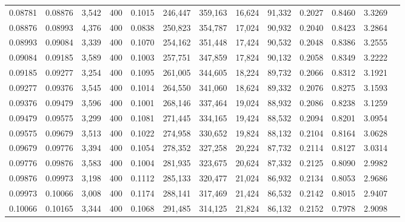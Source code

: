 \begin{tabular}{rrrrrrrrrrrrr}
0.08781 & 0.08876 &  3,542 & 400 &                                     0.1015 & 246,447 & 359,163 &  16,624 &  91,332 & 0.2027 & 0.8460 & 3.3269 \\
0.08876 & 0.08993 &  4,376 & 400 &                                     0.0838 & 250,823 & 354,787 &  17,024 &  90,932 & 0.2040 & 0.8423 & 3.2864 \\
0.08993 & 0.09084 &  3,339 & 400 &                                     0.1070 & 254,162 & 351,448 &  17,424 &  90,532 & 0.2048 & 0.8386 & 3.2555 \\
0.09084 & 0.09185 &  3,589 & 400 &                                     0.1003 & 257,751 & 347,859 &  17,824 &  90,132 & 0.2058 & 0.8349 & 3.2222 \\
0.09185 & 0.09277 &  3,254 & 400 &                                     0.1095 & 261,005 & 344,605 &  18,224 &  89,732 & 0.2066 & 0.8312 & 3.1921 \\
0.09277 & 0.09376 &  3,545 & 400 &                                     0.1014 & 264,550 & 341,060 &  18,624 &  89,332 & 0.2076 & 0.8275 & 3.1593 \\
0.09376 & 0.09479 &  3,596 & 400 &                                     0.1001 & 268,146 & 337,464 &  19,024 &  88,932 & 0.2086 & 0.8238 & 3.1259 \\
0.09479 & 0.09575 &  3,299 & 400 &                                     0.1081 & 271,445 & 334,165 &  19,424 &  88,532 & 0.2094 & 0.8201 & 3.0954 \\
0.09575 & 0.09679 &  3,513 & 400 &                                     0.1022 & 274,958 & 330,652 &  19,824 &  88,132 & 0.2104 & 0.8164 & 3.0628 \\
0.09679 & 0.09776 &  3,394 & 400 &                                     0.1054 & 278,352 & 327,258 &  20,224 &  87,732 & 0.2114 & 0.8127 & 3.0314 \\
0.09776 & 0.09876 &  3,583 & 400 &                                     0.1004 & 281,935 & 323,675 &  20,624 &  87,332 & 0.2125 & 0.8090 & 2.9982 \\
0.09876 & 0.09973 &  3,198 & 400 &                                     0.1112 & 285,133 & 320,477 &  21,024 &  86,932 & 0.2134 & 0.8053 & 2.9686 \\
0.09973 & 0.10066 &  3,008 & 400 &                                     0.1174 & 288,141 & 317,469 &  21,424 &  86,532 & 0.2142 & 0.8015 & 2.9407 \\
0.10066 & 0.10165 &  3,344 & 400 &                                     0.1068 & 291,485 & 314,125 &  21,824 &  86,132 & 0.2152 & 0.7978 & 2.9098 \\

\end{tabular}
